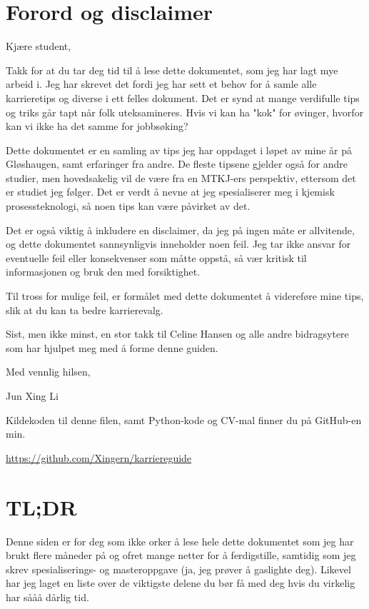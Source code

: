 \chapter*{Forord og disclaimer}

{

Kjære student,

Takk for at du tar deg tid til å lese dette dokumentet, som jeg har lagt mye arbeid i. Jeg har skrevet det fordi jeg har sett et behov for å samle alle karrieretips og diverse i ett felles dokument. Det er synd at mange verdifulle tips og triks går tapt når folk uteksamineres. Hvis vi kan ha "kok" for øvinger, hvorfor kan vi ikke ha det samme for jobbsøking?

Dette dokumentet er en samling av tips jeg har oppdaget i løpet av mine år på Gløshaugen, samt erfaringer fra andre. De fleste tipsene gjelder også for andre studier, men hovedsakelig vil de være fra en MTKJ-ers perspektiv, ettersom det er studiet jeg følger. Det er verdt å nevne at jeg spesialiserer meg i kjemisk prosessteknologi, så noen tips kan være påvirket av det.

Det er også viktig å inkludere en disclaimer, da jeg på ingen måte er allvitende, og dette dokumentet sannsynligvis inneholder noen feil. Jeg tar ikke ansvar for eventuelle feil eller konsekvenser som måtte oppstå, så vær kritisk til informasjonen og bruk den med forsiktighet.

Til tross for mulige feil, er formålet med dette dokumentet å videreføre mine tips, slik at du kan ta bedre karrierevalg.

Sist, men ikke minst, en stor takk til Celine Hansen og alle andre bidragsytere som har hjulpet meg med å forme denne guiden.

Med vennlig hilsen,

\Large Jun Xing Li
}

\vspace{10cm}

Kildekoden til denne filen, samt Python-kode og CV-mal finner du på GitHub-en min.

\url{https://github.com/Xingern/karriereguide}



\newpage
\chapter*{TL;DR}

Denne siden er for deg som ikke orker å lese hele dette dokumentet som jeg har brukt flere måneder på og ofret mange netter for å ferdigstille, samtidig som jeg skrev spesialiserings- og masteroppgave (ja, jeg prøver å gaslighte deg). Likevel har jeg laget en liste over de viktigste delene du bør få med deg hvis du virkelig har sååå dårlig tid.


